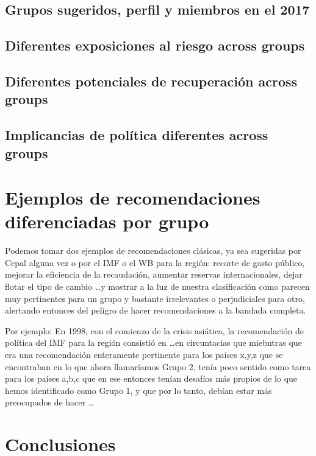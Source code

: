 \documentclass[12pt,a4paper]{article}
\begin{document}
  \subsection{Grupos sugeridos, perfil y miembros en el 2017}
  \subsection{Diferentes exposiciones al riesgo across groups}
  \subsection{Diferentes potenciales de recuperación across groups}
  \subsection{Implicancias de política diferentes across groups}
 


\newpage
\section{Ejemplos de recomendaciones diferenciadas por grupo}

Podemos tomar dos ejemplos de recomendaciones clásicas, ya sea sugeridas por Cepal alguna vez o por el IMF o el WB para la región: recorte de gasto público, mejorar la eficiencia de la recaudación, aumentar reservas internacionales, dejar flotar el tipo de cambio \ldots y mostrar a la luz de nuestra clasificación como parecen muy pertinentes para un grupo y bastante irrelevantes o perjudiciales para otro, alertando entonces del peligro de hacer recomendaciones a la bandada completa.

Por ejemplo: En 1998, con el comienzo de la crisis asiática, la recomendación de política del IMF para la región consistió en \ldots en circuntacias que miebntras que era una recomendación enteramente pertinente para los países x,y,z que se encontraban en lo que ahora llamaríamos Grupo 2, tenía poco sentido como tarea para los países a,b,c que en ese entonces tenían desafíos más propios de lo que hemos identificado como Grupo 1, y que por lo tanto, debían estar más preocupados de hacer \ldots

\section{Conclusiones}







	
\end{document}
